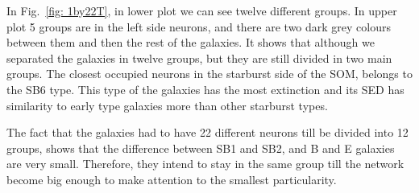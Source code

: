 \documentclass[useAMS,usenatbib]{mn2e}
\begin{document}
            In Fig.~\ref{fig: 1by22T}, in lower plot we can see twelve different groups. 
            In upper plot 5 groups are in the left side neurons, and there are two dark grey colours between them and then the rest of the galaxies. 
            It shows that although we separated the galaxies in twelve groups, but they are still divided in two main groups.
            The closest occupied neurons in the starburst side of the SOM, belongs to the SB6 type. 
            This type of the galaxies has the most extinction and its SED has similarity to early type galaxies more than other starburst types. 
            
            The fact that the galaxies had to have 22 different neurons till be divided into 12 groups, shows that the difference between SB1 and SB2, and B and E galaxies are very small.
            Therefore, they intend to stay in the same group till the network become big enough to make attention to the smallest particularity.
           
\end{document}
